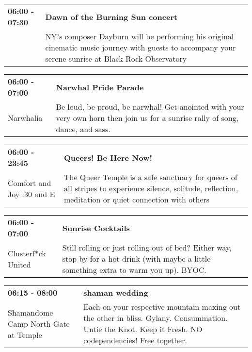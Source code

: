 \begin{tabular}{ p{1in} p{2.2in} }
    \textbf{06:00 - 07:30} & \textbf{Dawn of the Burning Sun concert} \\
    ~ \newline  & NY's composer Dayburn will be performing his original cinematic music journey with guests to accompany your serene sunrise at Black Rock Observatory \\
    \hline 
\end{tabular}
    
\begin{tabular}{ p{1in} p{2.2in} }
    \textbf{06:00 - 07:00} & \textbf{Narwhal Pride Parade} \\
    Narwhalia \newline  & Be loud, be proud, be narwhal! Get anointed with your very own horn then join us for a sunrise rally of song, dance, and sass. \\
    \hline 
\end{tabular}
    
\begin{tabular}{ p{1in} p{2.2in} }
    \textbf{06:00 - 23:45} & \textbf{Queers! Be Here Now!} \\
    Comfort and Joy \newline 7:30 and E & The Queer Temple is a safe sanctuary for queers of all stripes to experience silence, solitude, reflection, meditation or quiet connection with others \\
    \hline 
\end{tabular}
    
\begin{tabular}{ p{1in} p{2.2in} }
    \textbf{06:00 - 07:00} & \textbf{Sunrise Cocktails} \\
    Clusterf*ck United \newline  & Still rolling or just rolling out of bed? Either way, stop by for a hot drink (with maybe a little something extra to warm you up). BYOC. \\
    \hline 
\end{tabular}
    
\begin{tabular}{ p{1in} p{2.2in} }
    \textbf{06:15 - 08:00} & \textbf{shaman wedding} \\
    Shamandome Camp \newline North Gate at Temple & Each on your respective mountain maxing out the other in bliss. Gylany. Consummation. Untie the Knot. Keep it Fresh. NO codependencies! Free together. \\
    \hline 
\end{tabular}
    
